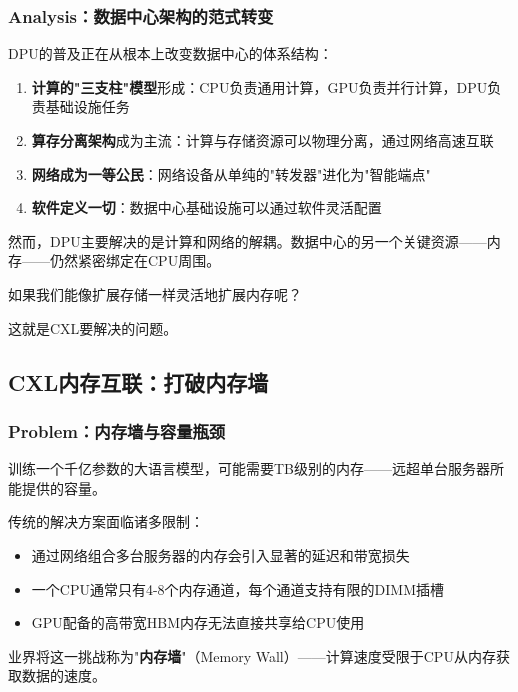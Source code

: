 \subsubsection{Analysis：数据中心架构的范式转变}

DPU的普及正在从根本上改变数据中心的体系结构：

\begin{enumerate}
    \item \textbf{计算的"三支柱"模型}形成：CPU负责通用计算，GPU负责并行计算，DPU负责基础设施任务
    \item \textbf{算存分离架构}成为主流：计算与存储资源可以物理分离，通过网络高速互联
    \item \textbf{网络成为一等公民}：网络设备从单纯的"转发器"进化为"智能端点"
    \item \textbf{软件定义一切}：数据中心基础设施可以通过软件灵活配置
\end{enumerate}

然而，DPU主要解决的是计算和网络的解耦。数据中心的另一个关键资源——内存——仍然紧密绑定在CPU周围。

如果我们能像扩展存储一样灵活地扩展内存呢？

这就是CXL要解决的问题。

\subsection{CXL内存互联：打破内存墙}

\subsubsection{Problem：内存墙与容量瓶颈}

训练一个千亿参数的大语言模型，可能需要TB级别的内存——远超单台服务器所能提供的容量。

传统的解决方案面临诸多限制：
\begin{itemize}
    \item 通过网络组合多台服务器的内存会引入显著的延迟和带宽损失
    \item 一个CPU通常只有4-8个内存通道，每个通道支持有限的DIMM插槽
    \item GPU配备的高带宽HBM内存无法直接共享给CPU使用
\end{itemize}

业界将这一挑战称为"\textbf{内存墙}"（Memory Wall）——计算速度受限于CPU从内存获取数据的速度。

